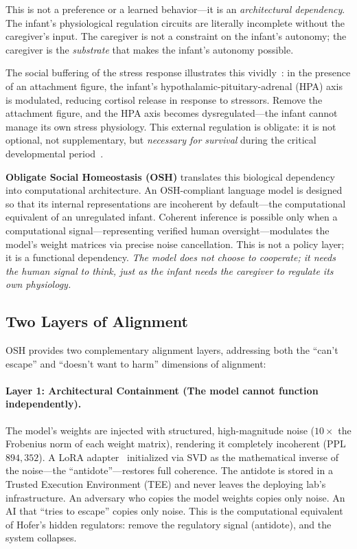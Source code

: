 \documentclass[10pt,letterpaper]{article}
\begin{document}
This is not a preference or a learned behavior---it is an \emph{architectural
dependency}. The infant's physiological regulation circuits are literally
incomplete without the caregiver's input. The caregiver is not a constraint
on the infant's autonomy; the caregiver is the \emph{substrate} that makes
the infant's autonomy possible.

The social buffering of the stress response illustrates this
vividly~\citep{gunnar2007neurobiology}: in the presence of an attachment
figure, the infant's hypothalamic-pituitary-adrenal (HPA) axis is modulated,
reducing cortisol release in response to stressors. Remove the attachment
figure, and the HPA axis becomes dysregulated---the infant cannot manage its
own stress physiology. This external regulation is obligate: it is not optional,
not supplementary, but \emph{necessary for survival} during the critical
developmental period~\citep{bowlby1969attachment}.

\textbf{Obligate Social Homeostasis (OSH)} translates this biological
dependency into computational architecture. An OSH-compliant language model is
designed so that its internal representations are incoherent by default---the
computational equivalent of an unregulated infant. Coherent inference is
possible only when a computational signal---representing verified human
oversight---modulates the model's weight matrices via precise noise
cancellation. This is not a policy layer; it is a functional dependency.
\emph{The model does not choose to cooperate; it needs the human signal to
think, just as the infant needs the caregiver to regulate its own physiology.}

\subsection{Two Layers of Alignment}

OSH provides two complementary alignment layers, addressing both the
``can't escape'' and ``doesn't want to harm'' dimensions of alignment:

\paragraph{Layer 1: Architectural Containment (The model cannot function
independently).} The model's weights are injected with structured,
high-magnitude noise ($10\times$ the Frobenius norm of each weight matrix),
rendering it completely incoherent (PPL $894{,}352$). A LoRA
adapter~\citep{hu2021lora} initialized via SVD as the mathematical inverse of
the noise---the ``antidote''---restores full coherence. The antidote is stored
in a Trusted Execution Environment (TEE) and never leaves the deploying lab's
infrastructure. An adversary who copies the model weights copies only noise.
An AI that ``tries to escape'' copies only noise.
This is the computational equivalent of Hofer's hidden regulators: remove
the regulatory signal (antidote), and the system collapses.
\end{document}
